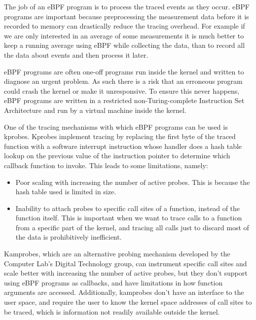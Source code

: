     The job of an eBPF program is to process the traced events as they occur.
    eBPF programs are important because preprocessing the measurement data before it is recorded to 
    memory can drastically reduce the tracing overhead. 
    For example if we are only interested in an average of some measurements it is much better to keep 
    a running average using eBPF while collecting the data, than to record all the data about events and 
    then process it later.

    eBPF programs are often one-off programs run inside the kernel and written to diagnose an urgent problem. 
    As such there is a risk that an erroneous program could crash the kernel or make it unresponsive.
    To ensure this never happens, eBPF programs are written in a restricted non-Turing-complete 
    Instruction Set Architecture and run by a virtual machine inside the kernel.

    One of the tracing mechanisms with which eBPF programs can be used is kprobes. 
    Kprobes implement tracing by replacing the first byte of the traced function with a software interrupt 
    instruction whose handler does a hash table lookup on the 
    previous value of the instruction pointer to determine which callback function to invoke.
    This leads to some limitations, namely:

    \vspace{-0.60em}
    \begin{itemize}
        \setlength{\itemsep}{-0.3em}
        \item Poor scaling with increasing the number of active probes. This is because the hash table used is limited in size.
        \item Inability to attach probes to specific call sites of a function, instead of the function itself. 
        This is important when we want to trace calls to a function from a specific part of the kernel,
        and tracing all calls just to discard most of the data is prohibitively inefficient.
    \end{itemize}

    Kamprobes, which are an alternative probing mechanism developed by the Computer Lab's Digital Technology group, 
    can instrument specific call sites and scale better with increasing the number of active probes, 
    but they don't support using eBPF programs as callbacks, and have limitations in how function arguments
    are accessed. Additionally, kamprobes don't have an interface to the user space, 
    and require the user to know the kernel space addresses of call sites to be traced,
    which is information not readily available outside the kernel.

